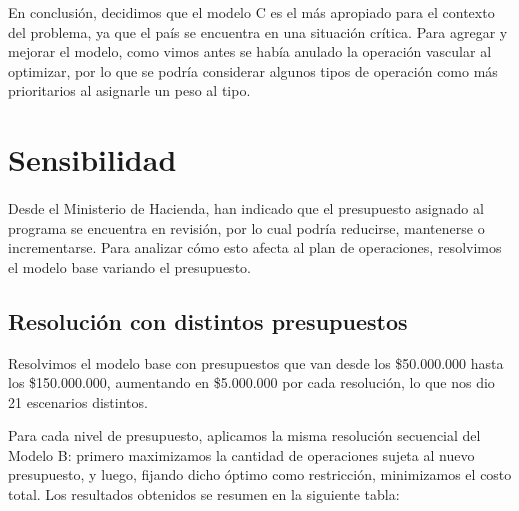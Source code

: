 \documentclass[a4paper,12pt]{book}
\begin{document}
	En conclusión, decidimos que el modelo C es el más apropiado para el contexto del problema, ya que el país se encuentra en una situación crítica. Para agregar y mejorar el modelo, como vimos antes se había anulado la operación vascular al optimizar, por lo que se podría considerar algunos tipos de operación como más prioritarios al asignarle un peso al tipo.

	\section{Sensibilidad}
	\paragraph{}Desde el Ministerio de Hacienda, han indicado que el presupuesto asignado al programa se encuentra en revisión, por lo cual podría reducirse, mantenerse o incrementarse. Para analizar cómo esto afecta al plan de operaciones, resolvimos el modelo base variando el presupuesto.

	\subsection{Resolución con distintos presupuestos}
	Resolvimos el modelo base con presupuestos que van desde los \$50.000.000 hasta los \$150.000.000, aumentando en \$5.000.000 por cada resolución, lo que nos dio 21 escenarios distintos.

	Para cada nivel de presupuesto, aplicamos la misma resolución secuencial del Modelo B: primero maximizamos la cantidad de operaciones sujeta al nuevo presupuesto, y luego, fijando dicho óptimo como restricción, minimizamos el costo total. Los resultados obtenidos se resumen en la siguiente tabla:
\end{document}
